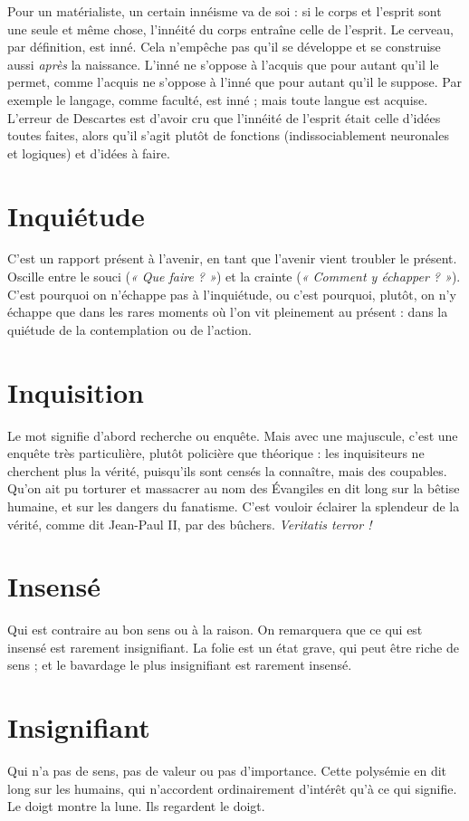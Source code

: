 Pour un matérialiste, un certain innéisme va de soi : si le corps et l'esprit
sont une seule et même chose, l’innéité du corps entraîne celle de l’esprit. Le
cerveau, par définition, est inné. Cela n'empêche pas qu’il se développe et se
construise aussi {\it après} la naissance. L’inné ne s’oppose à l’acquis que pour autant
qu'il le permet, comme l’acquis ne s'oppose à l’inné que pour autant qu’il le
suppose. Par exemple le langage, comme faculté, est inné ; mais toute langue
est acquise. L'erreur de Descartes est d’avoir cru que l’innéité de l'esprit était
celle d’idées toutes faites, alors qu’il s’agit plutôt de fonctions (indissociablement
neuronales et logiques) et d’idées à faire.

\section{Inquiétude}
C’est un rapport présent à l’avenir, en tant que l’avenir
vient troubler le présent. Oscille entre le souci ({\it « Que faire ? »})
et la crainte ({\it « Comment y échapper ? »}). C’est pourquoi on n’échappe pas à l’inquiétude,
ou c’est pourquoi, plutôt, on n’y échappe que dans les rares moments où l’on
vit pleinement au présent : dans la quiétude de la contemplation ou de l’action.

\section{Inquisition}
Le mot signifie d’abord recherche ou enquête. Mais avec
une majuscule, c’est une enquête très particulière, plutôt
policière que théorique : les inquisiteurs ne cherchent plus la vérité, puisqu'ils
sont censés la connaître, mais des coupables. Qu’on ait pu torturer et massacrer
au nom des Évangiles en dit long sur la bêtise humaine, et sur les dangers du
fanatisme. C’est vouloir éclairer la splendeur de la vérité, comme dit Jean-Paul II,
par des bûchers. {\it Veritatis terror !}

\section{Insensé}
Qui est contraire au bon sens ou à la raison.
On remarquera que ce qui est insensé est rarement insignifiant.
La folie est un état grave, qui peut être riche de sens ; et le bavardage le plus
insignifiant est rarement insensé.

\section{Insignifiant}
Qui n’a pas de sens, pas de valeur ou pas d'importance.
Cette polysémie en dit long sur les humains, qui n’accordent
ordinairement d'intérêt qu’à ce qui signifie. Le doigt montre la lune. Ils
regardent le doigt.

